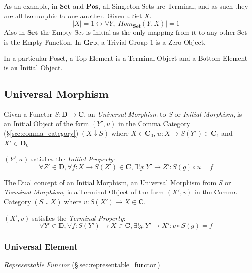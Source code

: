 As an example, in $\mathbf{Set}$ and $\mathbf{Pos}$, all Singleton
Sets are Terminal, and as such they are all Isomorphic to one another.
Given a Set $X$:
\[
    |X| = 1 \leftrightarrow \forall Y, |Hom_{\mathbf{Set}}(Y,X)| = 1
\]
Also in $\mathbf{Set}$ the Empty Set is Initial as the only mapping
from it to any other Set is the Empty Function. In $\mathbf{Grp}$, a
Trivial Group ${1}$ is a Zero Object.

In a particular Poset, a Top Element is a Terminal Object and a Bottom
Element is an Initial Object.



\subsection{Universal Morphism}\label{sec:universal_morphism}

Given a Functor $S: \mathbf{D} \rightarrow \mathbf{C}$, an
\emph{Universal Morphism} to $S$ or \emph{Initial Morphism}, is an
Initial Object of the form $(Y',u)$ in the Comma Category
(\S\ref{sec:comma_category}) $(X \downarrow S)$ where $X \in
\mathbf{C}_0$, $u : X \rightarrow S(Y') \in \mathbf{C}_1$ and $X' \in
\mathbf{D}_0$.

$(Y', u)$ satisfies the \emph{Initial Property}:
\[
    \forall Z' \in \mathbf{D}, \forall f : X \rightarrow S(Z') \in
    \mathbf{C}, \exists! g : Y' \rightarrow Z' : S(g) \circ u = f
\]

The Dual concept of an Initial Morphism, an Universal Morphism from
$S$ or \emph{Terminal Morphism}, is a Terminal Object of the form
$(X',v)$ in the Comma Category $(S \downarrow X)$ where $v : S(X')
\rightarrow X \in \mathbf{C}$.

$(X',v)$ satisfies the \emph{Terminal Property}:
\[
    \forall Y' \in \mathbf{D}, \forall f : S(Y') \rightarrow X \in
    \mathbf{C}, \exists! g : Y' \rightarrow X' : v \circ S(g) = f
\]




\subsubsection{Universal Element}\label{sec:universal_element}

\emph{Representable Functor} (\S\ref{sec:representable_functor})

